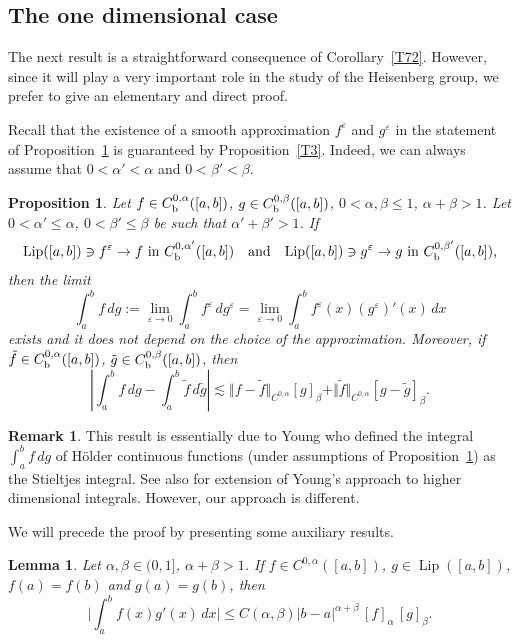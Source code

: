 \documentclass[intlimits,12pt,reqno]{amsart}
\newcommand{\eps}{\varepsilon}
\numberwithin{equation}{section}
\def\lip{\operatorname{Lip}}
\newtheorem{lemma}[theorem]{Lemma}
\newtheorem{proposition}[theorem]{Proposition}
\theoremstyle{definition}
\newtheorem{remark}[theorem]{Remark}
\begin{document}
\subsection{The one dimensional case}


The next result is a straightforward consequence of Corollary~\ref{T72}. However, since it will play a very important role in the study of the Heisenberg group, we prefer to give an elementary and direct proof.

Recall that the existence of a smooth approximation $f^\eps$ and $g^\eps$ in the statement of Proposition~\ref{T66} is guaranteed by Proposition~\ref{T3}. Indeed, we can always assume that $0<\alpha'<\alpha$ and $0<\beta'<\beta$.
\begin{proposition}
\label{T66}
Let $f\in C_{\rm b}^{0,\alpha}([a,b])$, $g\in C_{\rm b}^{0,\beta}([a,b])$, $0<\alpha,\beta\leq 1$, $\alpha+\beta>1$.
Let $0<\alpha'\leq\alpha$, $0<\beta'\leq\beta$ be such that $\alpha'+\beta'>1$. 
If
$$
\text{$\lip([a,b])\ni f^\eps\to f$ in $C_{\rm b}^{0,\alpha'}([a,b])$}
\quad
\text{and}
\quad
\text{$\lip([a,b])\ni g^\eps\to g$ in $C_{\rm b}^{0,\beta'}([a,b])$,}
$$
then the limit
\begin{equation}
\label{eq50}
\int_a^b f\, dg :=
\lim_{\eps\to 0} \int_a^b f^\eps\, d g^\eps=
\lim_{\eps\to 0} \int_a^b f^\eps(x)(g^\eps)'(x) \, dx
\end{equation}
exists and it does not depend on the choice of the approximation. Moreover, if
$\tilde{f}\in C_{\rm b}^{0,\alpha}([a,b])$, $\tilde{g}\in C_{\rm b}^{0,\beta}([a,b])$, then
\begin{equation}
\label{eq49}   
\left|\int_a^b f\, dg-\int_a^b \tilde{f}\, d\tilde{g}\right|\lesssim
\Vert f-\tilde{f}\Vert_{C^{0,\alpha}}[g]_\beta+
\Vert\tilde{f}\Vert_{C^{0,\alpha}}[g-\tilde{g}]_\beta.
\end{equation}
\end{proposition}
\begin{remark}
This result is essentially due to Young \cite{Young} who defined the integral $\int_a^b f\, dg$ of H\"older continuous functions (under assumptions of Proposition~\ref{T66}) as the Stieltjes integral. See also \cite{zust2,zust1} for extension of Young's approach to higher dimensional integrals. However, our approach is different. 
\end{remark}
We will precede the proof by presenting some auxiliary results.
\begin{lemma}
\label{T74}
Let $\alpha,\beta\in (0,1]$, $\alpha+\beta>1$. If $f\in C^{0,\alpha}([a,b])$, $g\in \lip([a,b])$, $f(a)=f(b)$ and $g(a)=g(b)$, then
$$
\Big|\int_a^b f(x)g'(x)\, dx\Big|\leq C(\alpha,\beta)|b-a|^{\alpha+\beta}\, [f]_{\alpha}\,[g]_{\beta}.
$$
\end{lemma}
\end{document}
